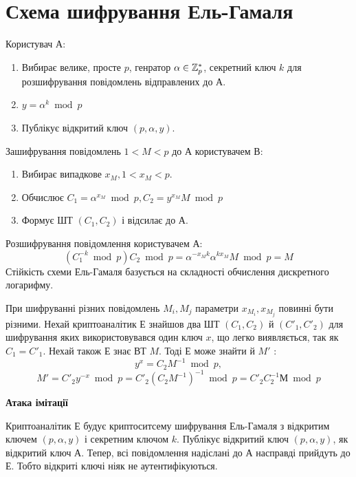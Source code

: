 \section{Схема шифрування Ель-Гамаля}
Користувач А:
\begin{enumerate}
\item 
Вибирає велике, просте  $p$, генратор $\alpha \in \mathbb Z^{*}_{p}$, 
секретний ключ $k$ для розшифрування повідомлень відправлених до А.
\item 
$ y=\alpha^k\bmod{p}$
\item 
Публікує відкритий ключ $(p, \alpha, y)$.
\end{enumerate}
Зашифрування повідомлень $1<M<p$ до А користувачем В:
\begin{enumerate}
\item 
Вибирає випадкове $x_{M}, 1<x_{M}<p$. 
\item 
Обчислює $C_{1}=\alpha^{x_{M}}\bmod{p}, C_{2}=y^{x_{M}}M\bmod{p}$
\item
Формує ШТ $(C_{1},  C_{2})$ і відсилає до А.
\end{enumerate}
Розшифрування повідомлення користувачем А:
\[ (C_{1}^{-k}\bmod{p})C_{2}\bmod{p}= \alpha^{-x_{M}k}\alpha^{kx_{M}}M\bmod{p}=M \]
Стійкість схеми Ель-Гамаля базується на складності обчислення дискретного логарифму.\par
\begin{remark}
При шифруванні різних повідомлень $M_{i}, M_{j}$ параметри $x_{M_{i}}, x_{M_{j}}$ повинні бути різними.
Нехай криптоаналітик Е знайшов два ШТ \( (C_{1},  C_{2}) \) й \( (C'_{1},  C'_{2}) \) для шифрування яких використовувався один ключ $x$, що легко виявляється, так як  \(C_{1}=C'_{1}\).
Нехай також Е знає ВТ \(M\). Тоді Е може знайти й \( M' \) : 
\[ y^x = C_2 M^{-1} \bmod{p},\]
\[M'=C'_{2}y^{-x}\bmod{p}=C'_{2}(C_{2} M^{-1})^{-1}\bmod{p}=C'_{2}C_{2}^{-1}М\bmod{p} \]
\end{remark}
\textbf{Атака імітації}\par
Криптоаналітик Е будує криптоситсему шифрування Ель-Гамаля з відкритим ключем $(p,\alpha,y)$ і секретним ключом $k$.
Публікує відкритий ключ $(p,\alpha,y)$, як відкритий ключ А. Тепер, всі повідомлення надіслані до А насправді прийдуть до Е.
Тобто відкриті ключі ніяк не аутентифікуються.\par

